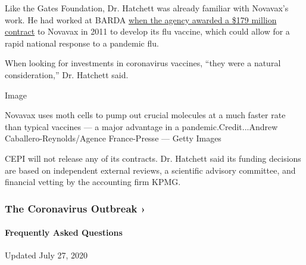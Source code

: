 Like the Gates Foundation, Dr. Hatchett was already familiar with
Novavax's work. He had worked at BARDA
\href{https://www.prnewswire.com/news-releases/novavax-awarded-hhs-barda-contract-valued-at-up-to-179-million-to-develop-pandemic-and-seasonal-influenza-vaccines-for-us-government-using-recombinant-vlp-technology-117145058.html}{when
the agency awarded a \$179 million contract} to Novavax in 2011 to
develop its flu vaccine, which could allow for a rapid national response
to a pandemic flu.

When looking for investments in coronavirus vaccines, ``they were a
natural consideration,'' Dr. Hatchett said.

Image

Novavax uses moth cells to pump out crucial molecules at a much faster
rate than typical vaccines --- a major advantage in a
pandemic.Credit...Andrew Caballero-Reynolds/Agence France-Presse ---
Getty Images

CEPI will not release any of its contracts. Dr. Hatchett said its
funding decisions are based on independent external reviews, a
scientific advisory committee, and financial vetting by the accounting
firm KPMG.

\href{https://www.nytimes3xbfgragh.onion/news-event/coronavirus?action=click\&pgtype=Article\&state=default\&region=MAIN_CONTENT_3\&context=storylines_faq}{}

\hypertarget{the-coronavirus-outbreak-}{%
\subsubsection{The Coronavirus Outbreak
›}\label{the-coronavirus-outbreak-}}

\hypertarget{frequently-asked-questions}{%
\paragraph{Frequently Asked
Questions}\label{frequently-asked-questions}}

Updated July 27, 2020

